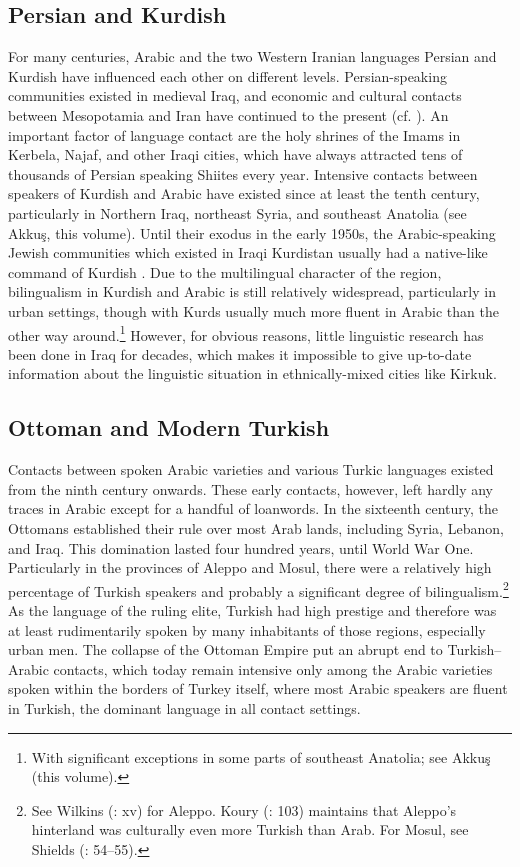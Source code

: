 \documentclass[output=paper]{langsci/langscibook}
\begin{document}
  \subsection{Persian and Kurdish} \label{persian} 
For many centuries, Arabic and the two Western Iranian languages Persian and Kurdish have influenced each other on different levels. Persian-speaking communities existed in medieval Iraq, and economic and cultural contacts between Mesopotamia and Iran have continued to the present (cf. \citealt{Gazsi2011}). An important factor of language contact are the holy shrines of the Imams in Kerbela, Najaf, and other Iraqi cities, which have always attracted tens of thousands of Persian speaking Shiites every year. Intensive contacts between speakers of Kurdish and Arabic have existed since at least the tenth century, particularly in Northern Iraq, northeast Syria, and southeast Anatolia (see Akkuş, this volume). Until their exodus in the early 1950s, the Arabic-speaking Jewish communities which existed in Iraqi Kurdistan usually had a native-like command of Kurdish \citep[12]{Jastrow1990}. Due to the multilingual character of the region, bilingualism in Kurdish and Arabic is still relatively widespread, particularly in urban settings, though with Kurds usually much more fluent in Arabic than the other way around.\footnote{With significant exceptions in some parts of southeast Anatolia; see Akkuş (this volume).} However, for obvious reasons, little linguistic research has been done in Iraq for decades, which makes it impossible to give up-to-date information about the linguistic situation in ethnically-mixed cities like Kirkuk.

 \subsection{Ottoman and Modern Turkish} 
Contacts between spoken Arabic varieties and various Turkic languages existed from the ninth century onwards. These early contacts, however, left hardly any traces in Arabic except for a handful of loanwords. In the sixteenth century, the Ottomans established their rule over most Arab lands, including Syria, Lebanon, and Iraq. This domination lasted four hundred years, until World War One. Particularly in the provinces of Aleppo and Mosul, there were a relatively high percentage of Turkish speakers and probably a significant degree of bilingualism.\footnote{See Wilkins (\citeyear{Wilkins2010}: xv) for Aleppo. Koury (\citeyear{Khoury1987}: 103) maintains that Aleppo’s hinterland was culturally even more Turkish than Arab. For Mosul, see Shields (\citeyear{Shields2004}: 54--55).} As the language of the ruling elite, Turkish had high prestige and therefore was at least rudimentarily spoken by many inhabitants of those regions, especially urban men. The collapse of the Ottoman Empire put an abrupt end to Turkish--Arabic contacts, which today remain intensive only among the Arabic varieties spoken within the borders of Turkey itself, where most Arabic speakers are fluent in Turkish, the dominant language in all contact settings.
\end{document}
